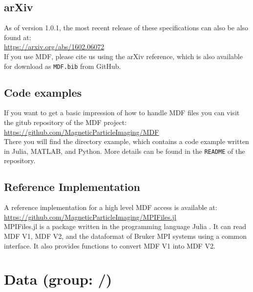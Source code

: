 \documentclass[landscape,a4paper]{article} %
\newcommand{\inlvar}[1]{{\ttfamily#1}}
\begin{document}
\begin{multicols}{2}
\subsection{arXiv}
As of version 1.0.1, the most recent release of these specifications can also be also found at:\\
\hspace*{1cm}\url{https://arxiv.org/abs/1602.06072}\\
If you use MDF, please cite us using the arXiv reference, which is also available for download as \texttt{MDF.bib} from GitHub.


\subsection{Code examples}		 
  		  
If you want to get a basic impression of how to handle MDF files you can visit the gitub repository of the MDF project:\\		
  \hspace*{1cm}\url{https://github.com/MagneticParticleImaging/MDF}\\	
There you will find the directory example, which contains a code example written in Julia, MATLAB, and Python. More details can be found in the \texttt{README} of the repository.
 
\subsection{Reference Implementation}		 

A reference implementation for a high level MDF access is available at:\\
  \hspace*{1cm}\url{https://github.com/MagneticParticleImaging/MPIFiles.jl}\\	
\inlvar{MPIFiles.jl} is a package written in the programming language Julia \cite{Bezanson2012,Bezanson2014,Bezanson2014a}. It can read MDF V1, MDF V2, and the dataformat of Bruker MPI systems using a common interface. It also provides  functions to convert MDF V1 into MDF V2.

\end{multicols}

\clearpage

\section{Data (group: \inlvar{/})}
 \setlength\extrarowheight{5pt}
\end{document}
